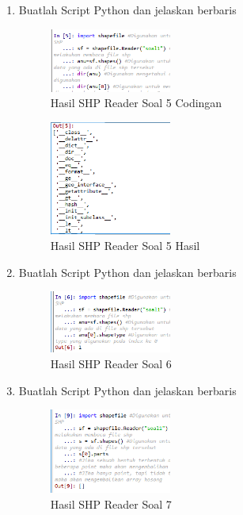\begin{enumerate}
    \item Buatlah Script Python dan jelaskan berbaris
    
    \hfill\break
    \begin{figure}[H]
		\includegraphics[width=4cm]{figures/1174009/3/5.png}
		\centering
		\caption{Hasil SHP Reader Soal 5 Codingan}
    \end{figure}

    \hfill\break
    \begin{figure}[H]
		\includegraphics[width=4cm]{figures/1174009/3/51.png}
		\centering
		\caption{Hasil SHP Reader Soal 5 Hasil}
    \end{figure}
    
    \item Buatlah Script Python dan jelaskan berbaris
    
    \hfill\break
    \begin{figure}[H]
		\includegraphics[width=4cm]{figures/1174009/3/6.png}
		\centering
		\caption{Hasil SHP Reader Soal 6}
    \end{figure}

    \item Buatlah Script Python dan jelaskan berbaris
    
    \hfill\break
    \begin{figure}[H]
		\includegraphics[width=4cm]{figures/1174009/3/7.png}
		\centering
		\caption{Hasil SHP Reader Soal 7}
    \end{figure}


\end{enumerate}
